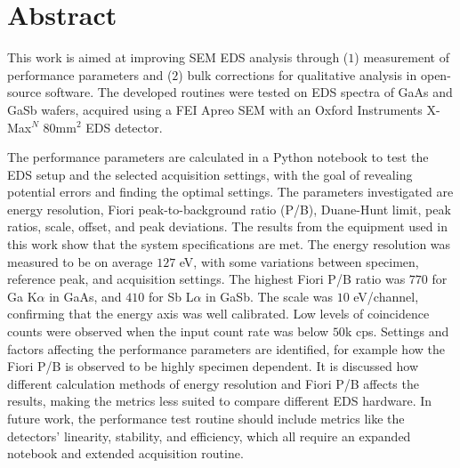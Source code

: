 \chapter*{Abstract}

\label{ch:abstract}

This work is aimed at improving SEM EDS analysis through ($1$) measurement of performance parameters and ($2$) bulk corrections for qualitative analysis in open-source software.
The developed routines were tested on EDS spectra of GaAs and GaSb wafers, acquired using a FEI Apreo SEM with an Oxford Instruments X-Max$^N$ $80$mm$^2$ EDS detector.

The performance parameters are calculated in a Python notebook to test the EDS setup and the selected acquisition settings, with the goal of revealing potential errors and finding the optimal settings.
The parameters investigated are energy resolution, Fiori peak-to-background ratio (P/B), Duane-Hunt limit, peak ratios, scale, offset, and peak deviations.
The results from the equipment used in this work show that the system specifications are met.
The energy resolution was measured to be on average $127$ eV, with some variations between specimen, reference peak, and acquisition settings.
The highest Fiori P/B ratio was $770$ for Ga K$\alpha$ in GaAs, and $410$ for Sb L$\alpha$ in GaSb.
The scale was $10$ eV/channel, confirming that the energy axis was well calibrated.
Low levels of coincidence counts were observed when the input count rate was below $50$k cps.
Settings and factors affecting the performance parameters are identified, for example how the Fiori P/B is observed to be highly specimen dependent.
It is discussed how different calculation methods of energy resolution and Fiori P/B affects the results, making the metrics less suited to compare different EDS hardware.
In future work, the performance test routine should include metrics like the detectors' linearity, stability, and efficiency, which all require an expanded notebook and extended acquisition routine.


